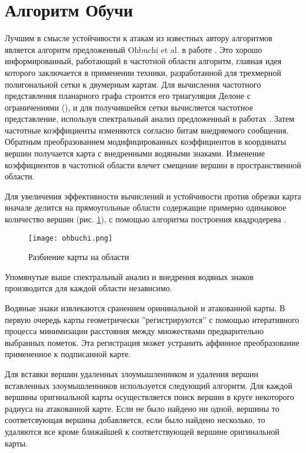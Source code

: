 \section{Алгоритм Обучи}
\label{sec:base}

Лучшим в смысле устойчивости к атакам из известных автору алгоритмов является алгоритм предложенный 
Ohbuchi et al. в работе \cite{Ohbuchi}. Это хорошо информированный, работающий в частотной области алгоритм,
главная идея которого заключается в применении техники, разработанной для трехмерной полигональной сетки к
двумерным картам.
Для вычисления частотного представления планарного графа строится его триагуляция Делоне с ограничениями 
(\cite{Chew}), и для получившейся сетки вычисляется частотное представление, используя спектральный анализ 
предложенный в работах \cite{Karni1, Karni2}. Затем частотные коэффициенты изменяются согласно битам 
внедряемого сообщения. Обратным преобразованием модифицированных коэффициентов в координаты вершин получается
карта с внедренными водяными знаками. Изменение коэффициентов в частотной области влечет смещение вершин в 
пространственной области.

Для увеличения эффективности вычислений и устойчивости против обрезки карта вначале делится на прямоугольные 
области содержащие примерно одинаковое количество вершин (рис. \ref{pic_ohbuchi}), с помощью алгоритма
построения квадродерева \cite{Samet}. 
\begin{figure}[h]
  \centering
  \texttt{[image: ohbuchi.png]}
  \caption{Разбиение карты на области}
  \label{pic_ohbuchi}
\end{figure}
Упомянутые выше спектральный анализ и внедрения водяных знаков производится для каждой области независимо.

Водяные знаки извлекаются сранением орининальной и атакованной карты. В первую очередь карты геометрически
''регистрируются'' с помощью итеративного процесса минимизации расстояния между множествами предварительно
выбранных пометок. Эта регистрация может устранить аффинное преобразование примененное к подписанной карте.

Для вставки вершин удаленных злоумышленником и удаления вершин вставленных злоумышленников используется 
следующий алгоритм. Для каждой вершины оригинальной
карты осуществляется поиск вершин в круге некоторого радиуса на атакованной карте. Если не было найдено ни одной,
вершины то соответсвующая вершина добавляется, если было найдено несколько, то удаляются все кроме ближайшей
к соответствующей вершине оригинальной карты.

